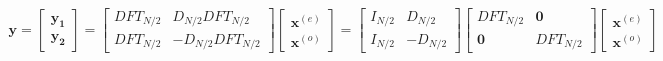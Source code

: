 \begin{align*}
    \mathbf{y}=
    \begin{bmatrix}
        \mathbf{y_1}\\
        \mathbf{y_2}
    \end{bmatrix}
    =
    \begin{bmatrix}
        DFT_{N/2} & D_{N/2}DFT_{N/2} \\
        DFT_{N/2} & -D_{N/2}DFT_{N/2}
    \end{bmatrix}
    \begin{bmatrix}
        \mathbf{x}^{(e)} \\
        \mathbf{x}^{(o)}
    \end{bmatrix}
    =
    \begin{bmatrix}
        I_{N/2} & D_{N/2} \\
        I_{N/2} & -D_{N/2}
    \end{bmatrix}
    \begin{bmatrix}
        DFT_{N/2} & \mathbf{0} \\
        \mathbf{0} & DFT_{N/2}
    \end{bmatrix}
    \begin{bmatrix}
        \mathbf{x}^{(e)} \\
        \mathbf{x}^{(o)}
    \end{bmatrix}
\end{align*}
